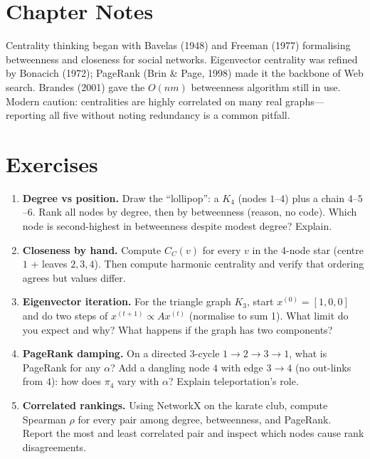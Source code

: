 \section{Chapter Notes}
Centrality thinking began with Bavelas (1948) and Freeman (1977) formalising betweenness and closeness for social networks. Eigenvector centrality was refined by Bonacich (1972); PageRank (Brin \& Page, 1998) made it the backbone of Web search. Brandes (2001) gave the $O(nm)$ betweenness algorithm still in use. Modern caution: centralities are highly correlated on many real graphs---reporting all five without noting redundancy is a common pitfall.

\section{Exercises}
\label{sec:ch02-exercises}
\begin{enumerate}[label=E2.\arabic*, leftmargin=*, itemsep=0.8em]
    \item \textbf{Degree vs position.} Draw the ``lollipop'': a $K_4$ (nodes $1$--$4$) plus a chain $4$--$5$--$6$. Rank all nodes by degree, then by betweenness (reason, no code). Which node is second-highest in betweenness despite modest degree? Explain.
    \item \textbf{Closeness by hand.} Compute $C_C(v)$ for every $v$ in the 4-node star (centre $1$ + leaves $2,3,4$). Then compute harmonic centrality and verify that ordering agrees but values differ.
    \item \textbf{Eigenvector iteration.} For the triangle graph $K_3$, start $x^{(0)}=[1,0,0]$ and do two steps of $x^{(t+1)}\propto Ax^{(t)}$ (normalise to sum 1). What limit do you expect and why? What happens if the graph has two components?
    \item \textbf{PageRank damping.} On a directed 3-cycle $1\to2\to3\to1$, what is PageRank for any $\alpha$? Add a dangling node $4$ with edge $3\to4$ (no out-links from $4$): how does $\pi_4$ vary with $\alpha$? Explain teleportation's role.
    \item \textbf{Correlated rankings.} Using NetworkX on the karate club, compute Spearman $\rho$ for every pair among degree, betweenness, and PageRank. Report the most and least correlated pair and inspect which nodes cause rank disagreements.
\end{enumerate}
